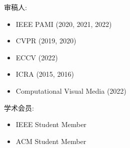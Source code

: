
\begin{cvparagraph}
	审稿人:
	\begin{itemize}
		\item IEEE PAMI (2020, 2021, 2022)
		\item CVPR (2019, 2020)
		\item ECCV (2022)
		\item ICRA (2015, 2016)
		\item Computational Visual Media (2022)
	\end{itemize}
	学术会员:
	\begin{itemize}
		\item IEEE Student Member
		\item ACM Student Member
	\end{itemize}
\end{cvparagraph}

